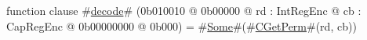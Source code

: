 function clause #\hyperref[sailMIPSzdecode]{decode}# (0b010010 @ 0b00000 @ rd : IntRegEnc @ cb : CapRegEnc @ 0b00000000 @ 0b000) = #\hyperref[sailMIPSzSome]{Some}#(#\hyperref[sailMIPSzCGetPerm]{CGetPerm}#(rd, cb))
